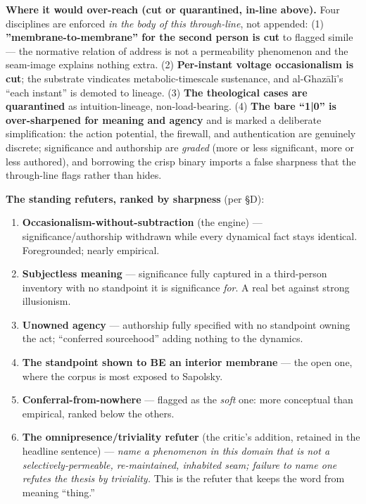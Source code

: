 \documentclass[11pt]{article}
\begin{document}
\textbf{Where it would over-reach (cut or quarantined, in-line above).} Four disciplines are enforced \emph{in the body of this through-line}, not appended: (1) \textbf{''membrane-to-membrane'' for the second person is cut} to flagged simile — the normative relation of address is not a permeability phenomenon and the seam-image explains nothing extra. (2) \textbf{Per-instant voltage occasionalism is cut}; the substrate vindicates metabolic-timescale sustenance, and al-Ghazālī's ``each instant'' is demoted to lineage. (3) \textbf{The theological cases are quarantined} as intuition-lineage, non-load-bearing. (4) \textbf{The bare ``1|0'' is over-sharpened for meaning and agency} and is marked a deliberate simplification: the action potential, the firewall, and authentication are genuinely discrete; significance and authorship are \emph{graded} (more or less significant, more or less authored), and borrowing the crisp binary imports a false sharpness that the through-line flags rather than hides.

\textbf{The standing refuters, ranked by sharpness} (per §D):

\begin{enumerate}
\item \textbf{Occasionalism-without-subtraction} (the engine) — significance/\allowbreak{}authorship withdrawn while every dynamical fact stays identical. Foregrounded; nearly empirical.
\item \textbf{Subjectless meaning} — significance fully captured in a third-person inventory with no standpoint it is significance \emph{for}. A real bet against strong illusionism.
\item \textbf{Unowned agency} — authorship fully specified with no standpoint owning the act; ``conferred sourcehood'' adding nothing to the dynamics.
\item \textbf{The standpoint shown to BE an interior membrane} — the open one, where the corpus is most exposed to Sapolsky.
\item \textbf{Conferral-from-nowhere} — flagged as the \emph{soft} one: more conceptual than empirical, ranked below the others.
\item \textbf{The omnipresence/\allowbreak{}triviality refuter} (the critic's addition, retained in the headline sentence) — \emph{name a phenomenon in this domain that is not a selectively-permeable, re-maintained, inhabited seam; failure to name one refutes the thesis by triviality.} This is the refuter that keeps the word from meaning ``thing.''
\end{enumerate}
\end{document}
